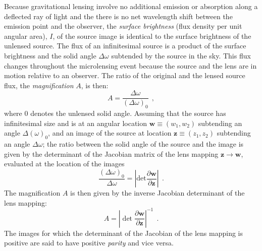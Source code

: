 \documentclass[12pt,dvipsnames]{report}
\newcommand{\hquad}{~~}
\begin{document}
Because gravitational lensing involve no additional emission or
absorption along a deflected ray of light and the there is no net wavelength shift 
between the emission point and the observer,  the \emph{surface brightness}
(flux density per unit angular area), $I$, of the source image is identical to
the surface brightness of the unlensed source. The flux of an infinitesimal
source is a product of the surface brightness and the solid angle $\Delta
    \omega$ subtended by the source in the sky. 
    This flux changes throughout the
microlensing event because the source and the lens are in motion relative to an
observer. The ratio of the original and the lensed source flux, the
\emph{magnification} $A$, is then: 
\begin{equation}
    A= \frac{\Delta \omega}{(\Delta\omega)_0}\hquad,
    \label{eq:magnification}
\end{equation}
where $0$ denotes the unlensed solid angle.
Assuming that the source has infinitesimal size and is at an angular location
$\mathbf w \equiv (w_1,w_2)$ subtending an angle
$\Delta (\omega)_0$, and an image of the source at location
$\mathbf z\equiv(z_1,z_2)$ subtending an angle
$\Delta \omega$; the ratio between the solid angle of the source and the image
is given by the determinant of the Jacobian matrix of the
lens mapping $\mathbf{z}\rightarrow\mathbf{w}$, evaluated at the location of
the images
\begin{equation}
    \frac{(\Delta\omega)_0}{\Delta\omega} =\left\lvert\textrm{det}
    \frac{\partial \mathbf w}{\partial \mathbf z} \right\rvert
    \hquad.
\end{equation}
The magnification $A$ is then given by the inverse Jacobian determinant
of the lens mapping:
\begin{equation}
    A= \left\lvert\det
    \frac{\partial \mathbf w}{\partial \mathbf z} \right\rvert^{-1} 
    \hquad.
    \label{eq:magnification_general}
\end{equation}
The images for which the determinant of the Jacobian of the lens mapping is
positive are said to have positive \emph{parity} and vice versa.
\end{document}
